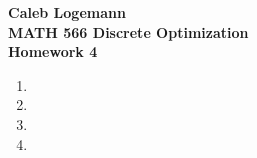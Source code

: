 \documentclass[11pt, oneside]{article}
\begin{document}
\noindent \textbf{\Large{Caleb Logemann \\
MATH 566 Discrete Optimization\\
Homework 4
}}

%
\begin{enumerate}
    \item %
    \item %
    \item %
    \item %
\end{enumerate}
\end{document}
